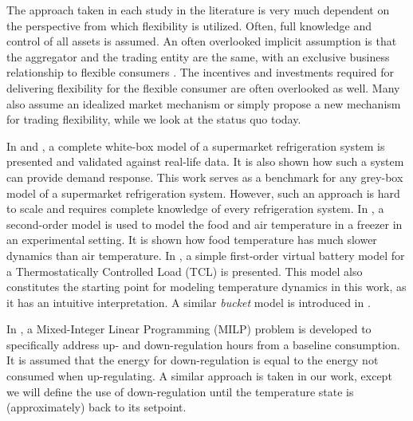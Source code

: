 The approach taken in each study in the literature is very much dependent on the perspective from which flexibility is utilized. Often, full knowledge and control of all assets is assumed. An often overlooked implicit assumption is that the aggregator and the trading entity are the same, with an exclusive business relationship to flexible consumers \cite{gade2022ecosystem}. The incentives and investments required for delivering flexibility for the flexible consumer are often overlooked as well. Many also assume an idealized market mechanism or simply propose a new mechanism for trading flexibility, while we look at the status quo today.

In \cite{petersen2012eso2} and \cite{pedersen2013direct}, a complete white-box model of a supermarket refrigeration system is presented and validated against real-life data. It is also shown how such a system can provide demand response. This work serves as a  benchmark for any grey-box model of a supermarket refrigeration system. However, such an approach is hard to scale and requires complete knowledge of every refrigeration system. In \cite{pedersen2016improving}, a second-order model is used to model the food and air temperature in a freezer in an experimental setting. It is shown how food temperature has much slower dynamics than air temperature. In \cite{hao2014aggregate}, a simple first-order virtual battery model for a Thermostatically Controlled Load (TCL) is presented. This model also constitutes the starting point for modeling temperature dynamics in this work, as it has an intuitive interpretation. A similar \textit{bucket} model is introduced in \cite{petersen2013taxonomy}.


In \cite{de2019leveraging}, a Mixed-Integer Linear Programming (MILP) problem  is developed to specifically address up- and down-regulation hours from a baseline consumption. It is assumed that the energy for down-regulation is equal to the energy not consumed when up-regulating. A similar approach is taken in our work, except we will define the use of down-regulation until the temperature state is (approximately) back to its setpoint.

